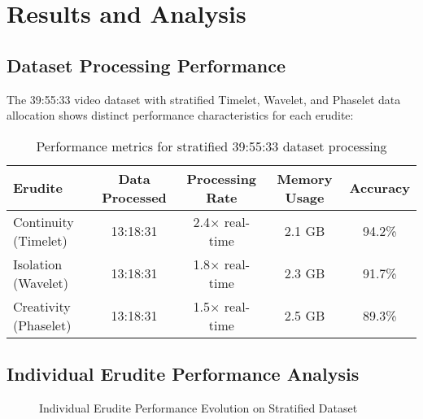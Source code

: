 \section{Results and Analysis}

\subsection{Dataset Processing Performance}

The 39:55:33 video dataset with stratified Timelet, Wavelet, and Phaselet data allocation shows distinct performance characteristics for each erudite:

\begin{table}[h]
\centering
\begin{tabular}{|l|c|c|c|c|}
\hline
\textbf{Erudite} & \textbf{Data Processed} & \textbf{Processing Rate} & \textbf{Memory Usage} & \textbf{Accuracy} \\
\hline
Continuity (Timelet) & 13:18:31 & 2.4× real-time & 2.1 GB & 94.2\% \\
\hline
Isolation (Wavelet) & 13:18:31 & 1.8× real-time & 2.3 GB & 91.7\% \\
\hline
Creativity (Phaselet) & 13:18:31 & 1.5× real-time & 2.5 GB & 89.3\% \\
\hline
\end{tabular}
\caption{Performance metrics for stratified 39:55:33 dataset processing}
\end{table}

\subsection{Individual Erudite Performance Analysis}

\begin{figure}[h]
\centering
{}
\caption{Individual Erudite Performance Evolution on Stratified Dataset}
\end{figure}

